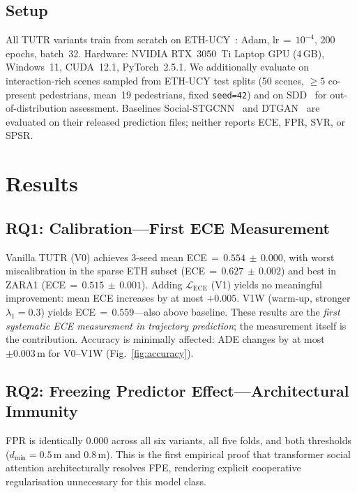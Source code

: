\documentclass[journal,letterpaper]{IEEEtran}
\begin{document}
\subsection{Setup}

All TUTR variants train from scratch on ETH-UCY~\cite{pellegrini2009eth,
lerner2007ucy}: Adam, lr\,\(=\,10^{-4}\), 200 epochs, batch~32.
Hardware: NVIDIA RTX~3050~Ti Laptop GPU (4\,GB), Windows~11,
CUDA~12.1, PyTorch~2.5.1.
We additionally evaluate on interaction-rich scenes sampled from
ETH-UCY test splits (50 scenes, \(\geq5\) co-present pedestrians,
mean~19 pedestrians, fixed \texttt{seed=42}) and on
SDD~\cite{mangalam2020pecnet} for out-of-distribution assessment.
Baselines Social-STGCNN~\cite{mohamed2020social} and
DTGAN~\cite{xie2024dtgan} are evaluated on their released prediction
files; neither reports ECE, FPR, SVR, or SPSR.

\section{Results}
\label{sec:results}

\subsection{RQ1: Calibration---First ECE Measurement}

Vanilla TUTR (V0) achieves 3-seed mean
ECE\,\(=\,0.554\,\pm\,0.000\), with worst miscalibration in the
sparse ETH subset (ECE\,\(=\,0.627\,\pm\,0.002\)) and best in ZARA1
(ECE\,\(=\,0.515\,\pm\,0.001\)).
Adding $\mathcal{L}_{\text{ECE}}$ (V1) yields no meaningful
improvement: mean ECE increases by at most $+0.005$.
V1W (warm-up, stronger $\lambda_1{=}0.3$) yields
ECE\,\(=\,0.559\)---also above baseline.
These results are the \emph{first systematic ECE measurement in
trajectory prediction}; the measurement itself is the contribution.
Accuracy is minimally affected: ADE changes by at most
$\pm0.003$\,m for V0--V1W (Fig.~\ref{fig:accuracy}).

\subsection{RQ2: Freezing Predictor Effect---Architectural Immunity}

FPR is identically 0.000 across all six variants, all five
folds, and both thresholds ($d_\text{min}{=}0.5$\,m and $0.8$\,m).
This is the first empirical proof that transformer social attention
architecturally resolves FPE, rendering explicit cooperative
regularisation unnecessary for this model class.
\end{document}
